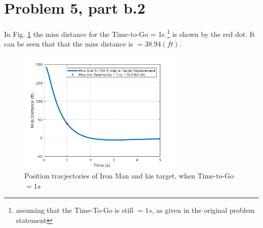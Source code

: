 \documentclass[paper=a4, fontsize=11pt]{scrartcl}
\numberwithin{equation}{section}		%
\numberwithin{figure}{section}			%
\numberwithin{table}{section}				%
\begin{document}
\section*{Problem 5, part b.2}
In Fig. \ref{fig:f7} the miss distance for the Time-to-Go = 1s \footnote{assuming that the Time-To-Go is still $=1 s$, as given in the original problem statement} is shown by the red dot. It can be seen that that the miss distance is $= 38.94 (ft)$. 
\begin{figure}[!htb]
	\centering
	\includegraphics[width=0.7\textwidth]{fiveb2}
	\caption{ Position tracjectories of Iron Man and his target, when Time-to-Go $= 1s$ \label{fig:f7}}
\end{figure}
\end{document}
